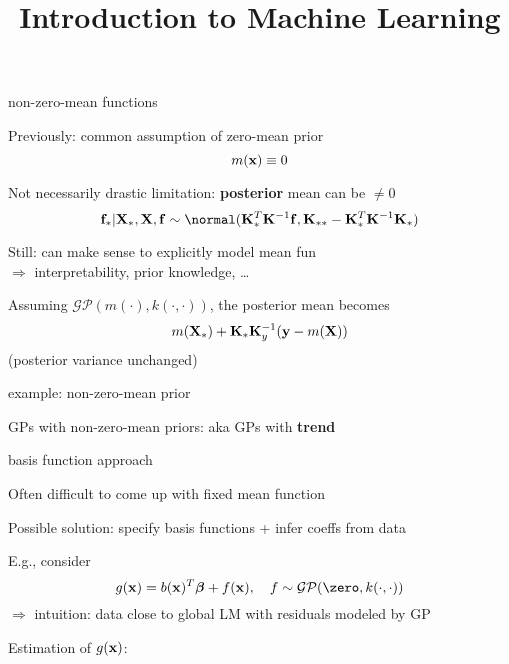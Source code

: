 \documentclass[11pt,compress,t,notes=noshow, xcolor=table]{beamer}
\title{Introduction to Machine Learning}
\begin{document}


\begin{framei}[sep=L]{non-zero-mean functions}
\item Previously: common assumption of zero-mean prior $$m(\mathbf{x}) \equiv 0$$
\item Not necessarily drastic limitation: \textbf{posterior} mean can be $\neq 0$
$$\fv_\ast | \Xmat_*, \Xmat, \fv \sim \normal(\Kmat_{*}^{T}\Kmat^{-1}\fv, \Kmat_{**} - \Kmat_*^T \Kmat ^{-1}\Kmat_*)$$
\item Still: can make sense to explicitly model mean fun \\$\Rightarrow$ interpretability, prior knowledge, \dots
\item Assuming $\mathcal{GP}(m(\cdot), k(\cdot, \cdot))$, the posterior mean becomes
$$m(\mathbf{X}_*) + \mathbf{K}_* \mathbf{K}_y^{-1} (\mathbf{y} - m(\mathbf{X}))$$
(posterior variance unchanged)
\end{framei}

\begin{framei}[sep=L]{example: non-zero-mean prior}
\item GPs with non-zero-mean priors: aka GPs with \textbf{trend}
\vfill
{}
\vfill
{}
\end{framei}

\begin{framei}[sep=L]{basis function approach}
\item Often difficult to come up with fixed mean function
\item Possible solution: specify basis functions + infer coeffs from data
\item E.g., consider $$g(\xv) = b(\xv)^T\bm{\beta} + \fx, \quad f  \sim \mathcal{GP}(\zero, k(\cdot, \cdot))$$
$\Rightarrow$ intuition: data close to global LM with residuals modeled by GP
\item Estimation of $g(\mathbf{x})$: 
\end{framei}

\end{document}
